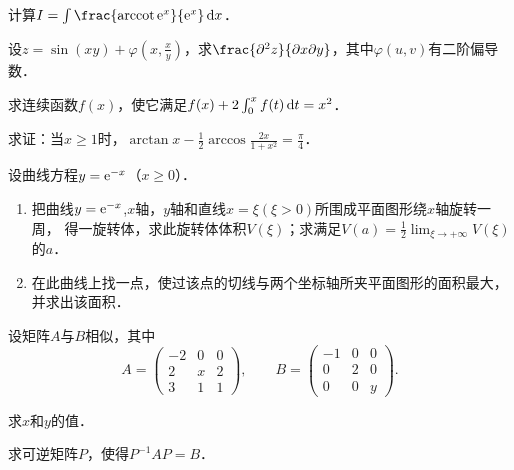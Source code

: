\documentclass[plain,noanswer,medmath]{../../template/jnuexam}
\begin{document}
\begin{problem}
计算$I = \int \frac{\arccot\e^x}{\e^x} \dx$．
\end{problem}



\begin{problem}
设$z = \sin(xy) + \varphi(x,\frac{x}{y})$，求$\frac{\pd^2 z}{\pdx\pd y}$，其中$\varphi (u,v)$有二阶偏导数．
\end{problem}



\begin{problem}
求连续函数$f(x)$，使它满足$f(x) + 2\int_0^x f(t)\mathop{}\!\mathrm{d} t = x^2$．
\end{problem}



\begin{problem}
求证：当$x \ge 1$时，$\arctan x - \frac{1}{2}\arccos \frac{2x}{1 + x^2} = \frac{\pi}{4}$．
\end{problem}



\begin{problem}
设曲线方程$y = \mathrm{e}^{- x}$（$x \ge 0$）．
\begin{enumerate}
\item 把曲线$y = \mathrm{e}^{- x}$,$x$轴，$y$轴和直线$x = \xi(\xi > 0)$所围成平面图形绕$x$轴旋转一周，
得一旋转体，求此旋转体体积$V(\xi)$；求满足$V(a) = \frac{1}{2}\lim_{\xi \to +\infty} V(\xi)$的$a$．
\item 在此曲线上找一点，使过该点的切线与两个坐标轴所夹平面图形的面积最大，并求出该面积．
\end{enumerate}
\end{problem}



\begin{problem}
设矩阵$A$与$B$相似，其中
$$A = \begin{pmatrix}
  -2 & 0 & 0 \\
   2 & x & 2 \\
   3 & 1 & 1
\end{pmatrix},\qquad B = \begin{pmatrix}
  -1 & 0 & 0 \\
   0 & 2 & 0 \\
   0 & 0 & y
\end{pmatrix}.$$
\begin{enumerate*}
\item 求$x$和$y$的值．
\item 求可逆矩阵$P$，使得$P^{-1} AP = B$．
\end{enumerate*}
\end{problem}
\end{document}
